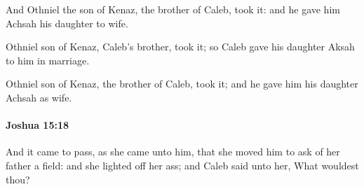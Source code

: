			\begin{versebox}
					\item[BHS] 
					\item[ASV] And Othniel the son of Kenaz, the brother of Caleb, took it: and he gave him Achsah his daughter to wife.
					\item[NIV] Othniel son of Kenaz, Caleb’s brother, took it; so Caleb gave his daughter Aksah to him in marriage.
					\item[NRSV] Othniel son of Kenaz, the brother of Caleb, took it; and he gave him his daughter Achsah as wife.
			\end{versebox}

		\paragraph{Joshua 15:18} %
			\label{JOSHUA-15-18}

			And it came to pass, as she came unto him, that she moved him to ask of her father a field: and she lighted off her ass; and Caleb said unto her, What wouldest thou?

